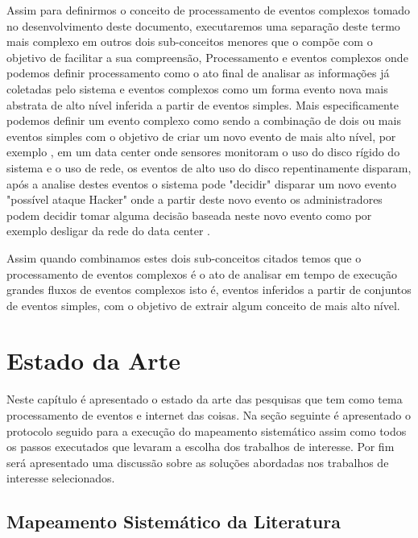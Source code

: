 \documentclass[tid,table]{texufpel} %
\begin{document}
Assim para definirmos o conceito de processamento de eventos complexos tomado no desenvolvimento deste documento, executaremos uma separação  deste termo mais complexo em outros dois sub-conceitos menores que o compõe com o objetivo de facilitar a sua compreensão, Processamento e eventos complexos onde podemos definir processamento como o ato final de analisar as informações já coletadas pelo sistema e eventos complexos como um forma evento nova mais abstrata de alto nível inferida a partir de eventos simples. Mais especificamente podemos definir um evento complexo como sendo a combinação de dois ou mais eventos simples com o objetivo de criar um novo evento de mais alto nível, por exemplo \cite{dayarathna2018recent}, em um data center onde sensores monitoram o uso do disco rígido do sistema e o uso de rede, os eventos de alto uso do disco repentinamente disparam, após a analise destes eventos o sistema pode "decidir" disparar um novo evento "possível ataque Hacker" onde a partir deste novo evento os administradores podem decidir tomar alguma decisão  baseada neste novo evento como por exemplo desligar da rede do data center \cite{wu2006high}. 

Assim quando combinamos estes dois sub-conceitos citados temos que o processamento de eventos complexos é o ato de analisar em tempo de execução grandes fluxos de eventos complexos isto é, eventos inferidos a partir de conjuntos de eventos simples, com o objetivo de extrair algum conceito de mais alto nível.  



\chapter{Estado da Arte} 
\label{cap:Estado_da_Arte}

Neste capítulo é apresentado o estado da arte das pesquisas que tem como tema processamento de eventos e internet das coisas. Na seção seguinte é apresentado o protocolo seguido para a execução do mapeamento sistemático assim como todos os passos executados que levaram a escolha dos trabalhos de interesse. Por fim será apresentado uma discussão sobre as soluções abordadas nos trabalhos de interesse selecionados.    

\section{Mapeamento Sistemático da Literatura}
\end{document}
